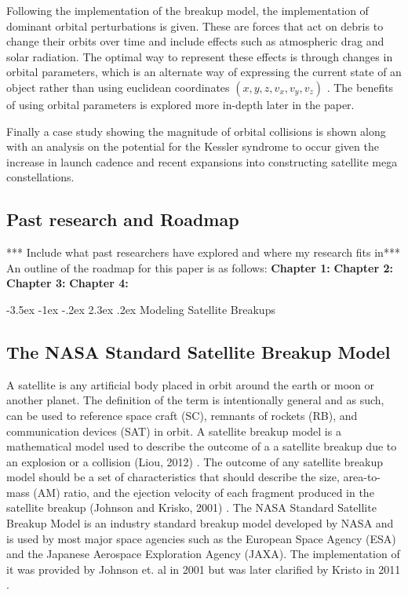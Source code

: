 \documentclass{article}
\makeatletter
\renewcommand\section{\clearpage\newpage\@startsection {section}{1}{\z@}%
	{-3.5ex \@plus -1ex \@minus -.2ex}%
	{2.3ex \@plus.2ex}%
	{\normalfont\Large\bfseries}}
\makeatother
\begin{document}
Following the implementation of the breakup model, the implementation of dominant orbital perturbations is given. These are forces that act on debris to change their orbits over time and include effects such as atmospheric drag and solar radiation. The optimal way to represent these effects is through changes in orbital parameters, which is an alternate way of expressing the current state of an object rather than using euclidean coordinates $(x,y,z, v_x, v_y, v_z)$ . The benefits of using orbital parameters is explored more in-depth later in the paper.

Finally a case study showing the magnitude of orbital collisions is shown along with an analysis on the potential for the Kessler syndrome to occur given the increase in launch cadence and recent expansions into constructing satellite mega constellations.

  
\subsection{Past research and Roadmap}
*** Include what past researchers have explored and where my research fits in*** \newline
An outline of the roadmap for this paper is as follows: \newline 
\textbf{Chapter 1:}  \newline 
\textbf{Chapter 2:}  \newline 
\textbf{Chapter 3:}  \newline 
\textbf{Chapter 4:}   \newline 
\singlespace

\section{Modeling Satellite Breakups}
\label{Modeling Satellite Breakups}
\doublespace


\subsection{The NASA Standard Satellite Breakup Model}

A satellite is any artificial body placed in orbit around the earth or moon or another planet. The definition of the term is intentionally general and as such, can be used to reference space craft (SC), remnants of rockets (RB), and communication devices (SAT) in orbit.  A satellite breakup model is a mathematical model used to describe the outcome of a a satellite breakup due to an explosion or a collision (Liou, 2012) \cite{jer_chyi_liou_orbital_nodate}.  The outcome of any satellite breakup model should be a set of characteristics that should describe the size, area-to-mass (AM) ratio, and the ejection velocity of each fragment produced in the satellite breakup (Johnson and Krisko, 2001) \cite{johnson_nasas_2001}. The NASA Standard Satellite Breakup Model is an industry standard breakup model developed by NASA and is used by most major space agencies such as the European Space Agency (ESA) and the Japanese Aerospace Exploration Agency (JAXA). The implementation of it was provided by Johnson et. al in 2001 \cite{johnson_nasas_2001} but was later clarified by Kristo in 2011 \cite{krisko_proper_2011}. 
\end{document}
